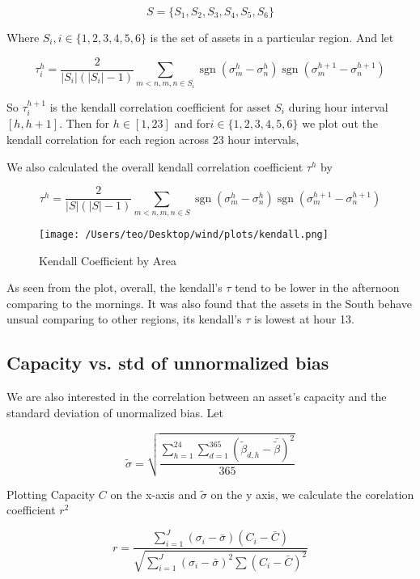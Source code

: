 \documentclass[
]{article}
\begin{document}
\[S = \{ S_1, S_2, S_3, S_4, S_5,S_6\}\]

Where \(S_i, i \in \{1,2,3,4,5,6\}\) is the set of assets in a
particular region. And let

\[\tau_i^{h}=\frac{2}{|S_i|(|S_i|-1)} \sum_{m<n, m,n \in S_i} \operatorname{sgn}\left(\sigma_{m}^{h}-\sigma_{n}^{h}\right) \operatorname{sgn}\left(\sigma_{m}^{h+1}-\sigma_{n}^{h+1}\right)\]

So \(\tau_i^{h+1}\) is the kendall correlation coefficient for asset
\(S_i\) during hour interval \([h,h+1]\). Then for \(h \in [1,23]\) and
for\(  i \in \{ 1,2,3,4,5,6\}\) we plot out the kendall correlation for
each region across 23 hour intervals,

We also calculated the overall kendall correlation coefficient
\(\tau^h\) by

\[\tau^{h}=\frac{2}{|S|(|S|-1)} \sum_{m<n, m,n \in S} \operatorname{sgn}\left(\sigma_{m}^{h}-\sigma_{n}^{h}\right) \operatorname{sgn}\left(\sigma_{m}^{h+1}-\sigma_{n}^{h+1}\right)\]

\begin{figure}
\centering
\texttt{[image: /Users/teo/Desktop/wind/plots/kendall.png]}
\caption{Kendall Coefficient by Area}
\end{figure}

As seen from the plot, overall, the kendall's \(\tau\) tend to be lower
in the afternoon comparing to the mornings. It was also found that the
assets in the South behave unsual comparing to other regions, its
kendall's \(\tau\) is lowest at hour 13.

\hypertarget{capacity-vs--std-of-unnormalized-bias}{%
\subsection{Capacity vs. std of unnormalized
bias}\label{capacity-vs--std-of-unnormalized-bias}}

We are also interested in the correlation between an asset's capacity
and the standard deviation of unormalized bias. Let

\[\tilde{\sigma}= \sqrt{\frac{\sum_{h = 1}^{24}\sum_{d = 1}^{365}\left(\tilde{\beta}_{d,h}-\bar{\tilde{\beta}}\right)^{2}}{365}}\]

Plotting Capacity \(C\) on the x-axis and \(\tilde{\sigma}\) on the y
axis, we calculate the corelation coefficient \(r^2\)

\[r=\frac{\sum_{i = 1}^J\left(\sigma_{i}-\bar{\sigma}\right)\left(C_{i}-\bar{C}\right)}{\sqrt{\sum_{i = 1}^J\left(\sigma_{i}-\bar{\sigma}\right)^{2} \sum\left(C_{i}-\bar{C}\right)^{2}}}\]
\end{document}
